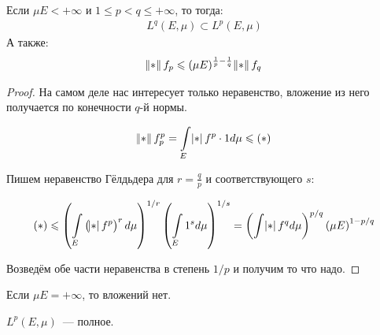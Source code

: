 \begin{theorem}
    Если $\mu E < +\infty$ и $1 \le p < q \le +\infty$, то тогда:
    \begin{gather*}
        L^q(E, \mu) \subset L^p(E, \mu)
    \end{gather*}
    А также:
    \begin{gather*}
        \norm{f}_p \le (\mu E)^{\frac{1}{p} - \frac{1}{q}} \norm{f}_q
    \end{gather*} 
\end{theorem}

\begin{proof}
    На самом деле нас интересует только неравенство, вложение из него
    получается по конечности $q$-й нормы.

    \[
        \norm{f}_p^p = \int\limits_E \abs{f}^p \cdot 1 d\mu \le (*)
    \]

    Пишем неравенство Гёлдьдера для $r = \frac qp$ и соответствующего $s$:

    \[
        (*) \le
        \left( \int\limits_E \left( \abs{f}^p \right)^r d\mu \right)^{1/r}
        \left( \int\limits_E 1^s d\mu \right)^{1/s}
        = \left( \int \abs{f}^q d\mu \right)^{p/q}
        \left( \mu E \right)^{1-p/q}
    \]

    Возведём обе части неравенства в степень $1/p$ и получим то что надо.
\end{proof}

\begin{observation}
    Если $\mu E = +\infty$, то вложений нет.
\end{observation}

\begin{theorem}
    $L^p(E, \mu)$~--- полное.
\end{theorem}

\newpage

